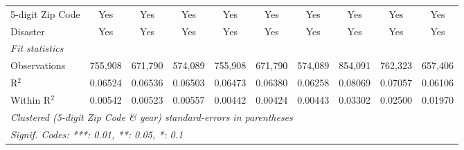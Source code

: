 \begin{tabular}{lccccccccc}
   5-digit Zip Code                                           & Yes                    & Yes            & Yes           & Yes           & Yes            & Yes           & Yes           & Yes           & Yes\\  
   Disaster                                                   & Yes                    & Yes            & Yes           & Yes           & Yes            & Yes           & Yes           & Yes           & Yes\\  
   \midrule
   \emph{Fit statistics}\\
   Observations                                               & 755,908                & 671,790        & 574,089       & 755,908       & 671,790        & 574,089       & 854,091       & 762,323       & 657,406\\  
   R$^2$                                                      & 0.06524                & 0.06536        & 0.06503       & 0.06473       & 0.06380        & 0.06258       & 0.08069       & 0.07057       & 0.06106\\  
   Within R$^2$                                               & 0.00542                & 0.00523        & 0.00557       & 0.00442       & 0.00424        & 0.00443       & 0.03302       & 0.02500       & 0.01970\\  
   \midrule \midrule
   \multicolumn{10}{l}{\emph{Clustered (5-digit Zip Code \& year) standard-errors in parentheses}}\\
   \multicolumn{10}{l}{\emph{Signif. Codes: ***: 0.01, **: 0.05, *: 0.1}}\\
\end{tabular}
\par\endgroup

